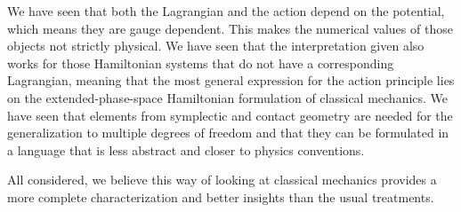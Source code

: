 \documentclass[10pt,twocolumn, nofootinbib]{revtex4-2}
\begin{document}
We have seen that both the Lagrangian and the action depend on the potential, which means they are gauge dependent. This makes the numerical values of those objects not strictly physical. We have seen that the interpretation given also works for those Hamiltonian systems that do not have a corresponding Lagrangian, meaning that the most general expression for the action principle lies on the extended-phase-space Hamiltonian formulation of classical mechanics. We have seen that elements from symplectic and contact geometry are needed for the generalization to multiple degrees of freedom and that they can be formulated in a language that is less abstract and closer to physics conventions.

All considered, we believe this way of looking at classical mechanics provides a more complete characterization and better insights than the usual treatments.


\end{document}
